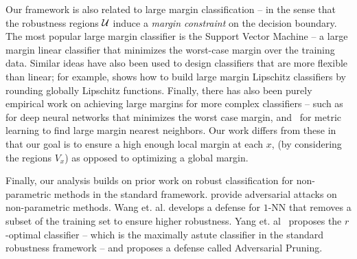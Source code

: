 Our framework is also related to large margin classification -- in the sense that the robustness regions ${\mathcal U}$ induce a {\em{margin constraint}} on the decision boundary. The most popular large margin classifier is the Support Vector Machine\cite{cortes95, Bennett00, Freund99} -- a large margin linear classifier that minimizes the worst-case margin over the training data. Similar ideas have also been used to design classifiers that are more flexible than linear; for example, \cite{Luxburg03} shows how to build large margin Lipschitz classifiers by rounding globally Lipschitz functions. Finally, there has also been purely empirical work on achieving large margins for more complex classifiers -- such as~\cite{Samy18} for deep neural networks that minimizes the worst case margin, and~\cite{Weinberger05} for metric learning to find large margin nearest neighbors. Our work differs from these in that our goal is to ensure a high enough local margin at each $x$, (by considering the \natural\emph{ }regions $V_x$) as opposed to optimizing a global margin. 









Finally, our analysis builds on prior work on robust classification for non-parametric methods in the standard framework. \cite{Amsaleg17, Sitawarin19, WJC18, YRWC19} provide adversarial attacks on non-parametric methods. Wang et. al. \cite{WJC18} develops a defense for $1$-NN that removes a subset of the training set to ensure higher robustness. Yang et. al~\cite{YRWC19} proposes the $r$-optimal classifier -- which is the maximally astute classifier in the standard robustness framework -- and proposes a defense called Adversarial Pruning. 


